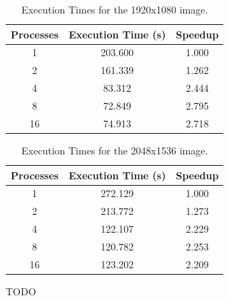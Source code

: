\documentclass[10pt,twocolumn,letterpaper]{article}
\begin{document}
\begin{table}[H]
	\begin{center}
		\begin{tabular}{|c|c|c|}
			\hline
			Processes & Execution Time (s) & Speedup \\
			\hline
			1 & 203.600 & 1.000 \\
			2 & 161.339 & 1.262 \\
			4 & 83.312 & 2.444 \\
			8 & 72.849 & 2.795 \\
			16 & 74.913 & 2.718 \\
			\hline
		\end{tabular}
	\end{center}
	\caption{Execution Times for the 1920x1080 image.}
	\label{tab:speedup_i_3}
\end{table}

\begin{table}[H]
	\begin{center}
		\begin{tabular}{|c|c|c|}
			\hline
			Processes & Execution Time (s) & Speedup \\
			\hline
			1 & 272.129 & 1.000 \\
			2 & 213.772 & 1.273 \\
			4 & 122.107 & 2.229 \\
			8 & 120.782 & 2.253 \\
			16 & 123.202 & 2.209 \\
			\hline
		\end{tabular}
	\end{center}
	\caption{Execution Times for the 2048x1536 image.}
	\label{tab:speedup_i_4}
\end{table}

TODO
%
\end{document}
